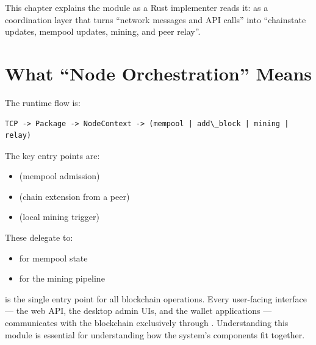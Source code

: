 This chapter explains the  module as a Rust implementer reads it: as a coordination layer that turns ``network messages and API calls'' into ``chainstate updates, mempool updates, mining, and peer relay''.

\section{What ``Node Orchestration'' Means}
\label{sec:ch13-what-means}

The runtime flow is:

\begin{verbatim}
TCP -> Package -> NodeContext -> (mempool | add\_block | mining | relay)
\end{verbatim}

The key entry points are:

\begin{itemize}
  \item {} (mempool admission)
  \item {} (chain extension from a peer)
  \item {} (local mining trigger)
\end{itemize}

These delegate to:

\begin{itemize}
  \item {} for mempool state
  \item {} for the mining pipeline
\end{itemize}

\begin{warnbox}
 is the single entry point for all blockchain operations. Every user-facing interface --- the web API, the desktop admin UIs, and the wallet applications --- communicates with the blockchain exclusively through . Understanding this module is essential for understanding how the system's components fit together.
\end{warnbox}

